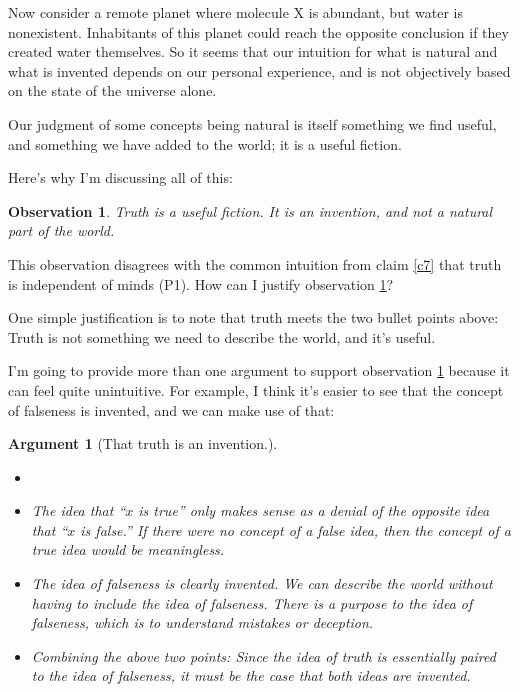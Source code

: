 \documentclass[11pt, oneside]{article}   	%
\newtheorem{obs}{Observation}
\newtheorem{argt}{Argument}
\begin{document}
Now consider a remote planet where molecule X is abundant, but water is
nonexistent. Inhabitants of this planet could reach the opposite conclusion if
they created water themselves. So it seems that our intuition for what is
natural and what is invented depends on our personal experience, and is
not objectively based on the state of the universe alone.

Our judgment of some concepts being natural is itself something
we find useful, and something we have added to the world; it is a useful
fiction.

Here's why I'm discussing all of this:
\begin{obs}\label{o3}
    Truth is a useful fiction. It is an invention, and not a natural part of the
    world.
\end{obs}

This observation disagrees with the common intuition from claim \ref{c7} that
truth is independent of minds (P1). How can I justify observation \ref{o3}?

One simple justification is to note that truth meets the two bullet points
above: Truth is not something we need to describe the world, and it's useful.

I'm going to provide more than one argument to support observation \ref{o3}
because it can feel quite unintuitive.
For example, I think it's easier to see that the concept
of falseness is invented, and we can make use of that:
\begin{argt}[That truth is an invention.]\label{a2}
    \normalfont
    \begin{itemize}
        \item[]
        \item
            The idea that ``$x$ is true'' only makes sense as a denial of the
            opposite idea that ``$x$ is false.'' If there were no concept of a
            false idea, then the concept of a true idea would be meaningless.
        \item
            The idea of falseness is clearly invented. We can describe
            the world without having to include the idea of falseness.
            There is a purpose to the idea of falseness, which is to understand
            mistakes or deception.
        \item
            Combining the above two points:
            Since the idea of truth is essentially paired to the idea of
            falseness,
            it must be the case that both ideas are invented.
    \end{itemize}
\end{argt}
\end{document}
